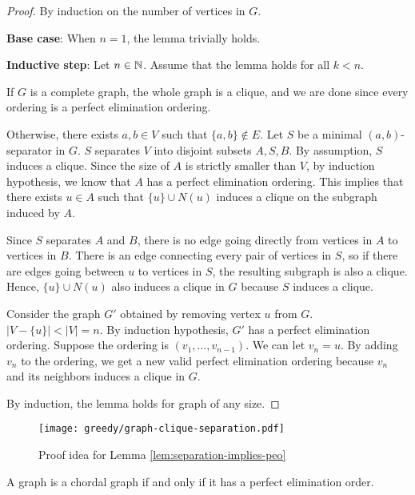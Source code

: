 \begin{proof}
    By induction on the number of vertices in $G$.

    \textbf{Base case}: When $n=1$, the lemma trivially holds.

    \textbf{Inductive step}: Let $n \in \mathbb{N}$. Assume that the lemma holds for all $k < n$.

    If $G$ is a complete graph, the whole graph is a clique, and we are done since every ordering is a perfect elimination ordering.

    Otherwise, there exists $a,b \in V$ such that $\{a,b\} \not\in E$. Let $S$ be a minimal $(a,b)$-separator in $G$. $S$ separates $V$ into disjoint subsets $A,S,B$. By assumption, $S$ induces a clique. Since the size of $A$ is strictly smaller than $V$, by induction hypothesis, we know that $A$ has a perfect elimination ordering. This implies that there exists $u \in A$ such that $\{u\} \cup N(u)$ induces a clique on the subgraph induced by $A$.

    Since $S$ separates $A$ and $B$, there is no edge going directly from vertices in $A$ to vertices in $B$. There is an edge connecting every pair of vertices in $S$, so if there are edges going between $u$ to vertices in $S$, the resulting subgraph is also a clique. Hence, $\{u\} \cup N(u)$ also induces a clique in $G$ because $S$ induces a clique.

    Consider the graph $G'$ obtained by removing vertex $u$ from $G$. $|V-\{u\}| < |V| = n$. By induction hypothesis, $G'$ has a perfect elimination ordering. Suppose the ordering is $(v_1,\ldots,v_{n-1})$. We can let $v_n = u$. By adding $v_n$ to the ordering, we get a new valid perfect elimination ordering because $v_{n}$ and its neighbors induces a clique in $G$.
    
    By induction, the lemma holds for graph of any size.
\end{proof}

\begin{figure}[htbp]
    \centering
    \texttt{[image: greedy/graph-clique-separation.pdf]}
    \caption{Proof idea for Lemma \ref{lem:separation-implies-peo}}
    \label{fig:graph-clique-separation}
\end{figure}

\begin{theorem}
    A graph is a chordal graph if and only if it has a perfect elimination order.
\end{theorem}

